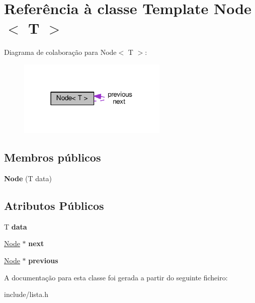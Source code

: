 \hypertarget{classNode}{}\section{Referência à classe Template Node$<$ T $>$}
\label{classNode}


Diagrama de colaboração para Node$<$ T $>$\+:\nopagebreak
\begin{figure}[H]
\begin{center}
\leavevmode
\includegraphics[width=202pt]{classNode__coll__graph}
\end{center}
\end{figure}
\subsection*{Membros públicos}
\begin{DoxyCompactItemize}
\item 
{\bfseries Node} (T data)\hypertarget{classNode_a0692b16d246460bf94c18d49592facdd}{}\label{classNode_a0692b16d246460bf94c18d49592facdd}

\end{DoxyCompactItemize}
\subsection*{Atributos Públicos}
\begin{DoxyCompactItemize}
\item 
T {\bfseries data}\hypertarget{classNode_ac450c71a8677a38d306361f9ced518d3}{}\label{classNode_ac450c71a8677a38d306361f9ced518d3}

\item 
\hyperlink{classNode}{Node} $\ast$ {\bfseries next}\hypertarget{classNode_ac1c0563946c59c36bddde431b4adb00b}{}\label{classNode_ac1c0563946c59c36bddde431b4adb00b}

\item 
\hyperlink{classNode}{Node} $\ast$ {\bfseries previous}\hypertarget{classNode_a36adf1fae9a4a993a348a26c2ba7ad8b}{}\label{classNode_a36adf1fae9a4a993a348a26c2ba7ad8b}

\end{DoxyCompactItemize}


A documentação para esta classe foi gerada a partir do seguinte ficheiro\+:\begin{DoxyCompactItemize}
\item 
include/lista.\+h\end{DoxyCompactItemize}
